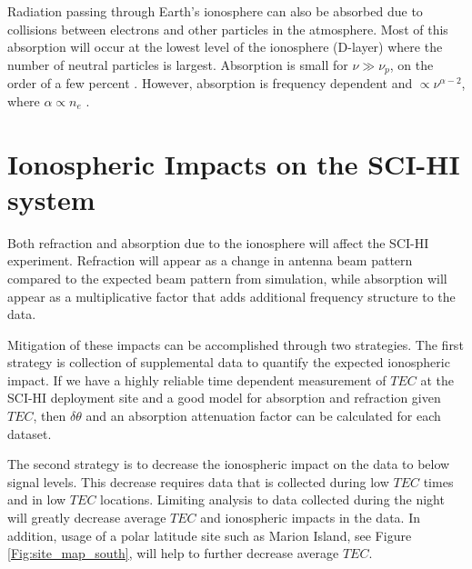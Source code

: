 Radiation passing through Earth's ionosphere can also be absorbed due to collisions between electrons and other particles in the atmosphere. Most of this absorption will occur at the lowest level of the ionosphere (D-layer) where the number of neutral particles is largest. Absorption is small for $\nu \gg \nu_p$, on the order of a few percent \cite{vedantham_2014}. However, absorption is frequency dependent and $\propto \nu^{\alpha -2}$, where $\alpha \propto n_e$ \cite{thompson_2001}. 



\section{Ionospheric Impacts on the SCI-HI system}

Both refraction and absorption due to the ionosphere will affect the SCI-HI experiment. Refraction will appear as a change in antenna beam pattern compared to the expected beam pattern from simulation, while absorption will appear as a multiplicative factor that adds additional frequency structure to the data. 

Mitigation of these impacts can be accomplished through two strategies. The first strategy is collection of supplemental data to quantify the expected ionospheric impact. If we have a highly reliable time dependent measurement of $TEC$ at the SCI-HI deployment site and a good model for absorption and refraction given $TEC$, then $\delta \theta$ and an absorption attenuation factor can be calculated for each dataset. 

The second strategy is to decrease the ionospheric impact on the data to below \cm signal levels. This decrease requires data that is collected during low $TEC$ times and in low $TEC$ locations. Limiting analysis to data collected during the night will greatly decrease average $TEC$ and ionospheric impacts in the data. In addition, usage of a polar latitude site such as Marion Island, see Figure \ref{Fig:site_map_south}, will help to further decrease average $TEC$.